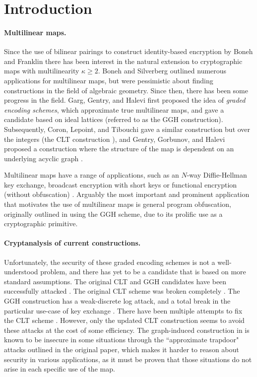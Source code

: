 \section{Introduction}

\paragraph{Multilinear maps.} Since the use of bilinear pairings to construct identity-based encryption by Boneh and Franklin \cite{bf} there has been interest in the natural extension to cryptographic maps with multilinearity $\kappa \geq 2$.  Boneh and Silverberg \cite{bs} outlined numerous applications for multilinear maps, but were pessimistic about finding constructions in the field of algebraic geometry.  Since then, there has been some progress in the field.  Garg, Gentry, and Halevi \cite{ggh13a} first proposed the idea of \textit{graded encoding schemes}, which approximate true multilinear maps, and gave a candidate based on ideal lattices (referred to as the GGH construction).  Subsequently, Coron, Lepoint, and Tibouchi gave a similar construction but over the integers (the CLT construction \cite{clt, clt15}), and Gentry, Gorbunov, and Halevi proposed a construction where the structure of the map is dependent on an underlying acyclic graph \cite{ggh14a}.

Multilinear maps have a range of applications, such as an $N$-way Diffie-Hellman key exchange, broadcast encryption with short keys \cite{bs} or functional encryption (without obfuscation) \cite{blr}.  Arguably the most important and prominent application that motivates the use of multilinear maps is general program obfuscation, originally outlined in \cite{ggh13b} using the GGH scheme, due to its prolific use as a cryptographic primitive.

\paragraph{Cryptanalysis of current constructions.}  Unfortunately, the security of these graded encoding schemes is not a well-understood problem, and there has yet to be a candidate that is based on more standard assumptions.  The original CLT and GGH candidates have been successfully attacked \cite{chl, cgh, hj}.  The original CLT scheme was broken completely \cite{chl, cgh}.  The GGH construction has a weak-discrete log attack, and a total break in the particular use-case of key exchange \cite{cgh, hj}.  There have been multiple attempts to fix the CLT scheme \cite{bwz, clt14, clt15}.  However, only the updated CLT construction \cite{clt15} seems to avoid these attacks at the cost of some efficiency.  The graph-induced construction in \cite{ggh14a} is known to be insecure in some situations through the ``approximate trapdoor" attacks outlined in the original paper, which makes it harder to reason about security in various applications, as it must be proven that those situations do not arise in each specific use of the map.

